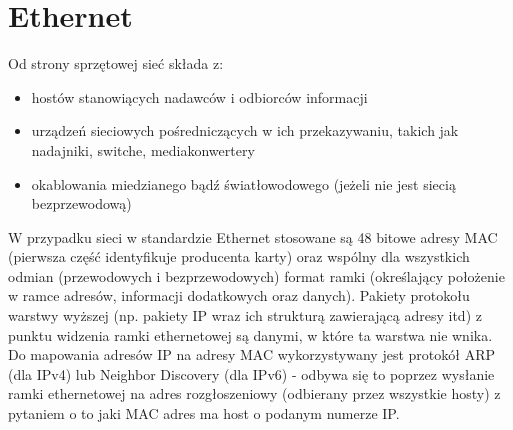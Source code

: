 % 
% 
% 
% 

\section{Ethernet}

Od strony sprzętowej sieć składa z:
\begin{itemize}
	\item hostów stanowiących nadawców i odbiorców informacji
	\item urządzeń sieciowych pośredniczących w ich przekazywaniu, takich jak nadajniki, switche, mediakonwertery
	\item okablowania miedzianego bądź światłowodowego (jeżeli nie jest siecią bezprzewodową)
\end{itemize}

W przypadku sieci w standardzie Ethernet stosowane są 48 bitowe adresy MAC (pierwsza część identyfikuje producenta karty) oraz wspólny dla wszystkich odmian (przewodowych i bezprzewodowych) format ramki (określający położenie w ramce adresów, informacji dodatkowych oraz danych). Pakiety protokołu warstwy wyższej (np. pakiety IP wraz ich strukturą zawierającą adresy itd) z punktu widzenia ramki ethernetowej są danymi, w które ta warstwa nie wnika. Do mapowania adresów IP na adresy MAC wykorzystywany jest protokół ARP (dla IPv4) lub Neighbor Discovery (dla IPv6) - odbywa się to poprzez wysłanie ramki ethernetowej na adres rozgłoszeniowy (odbierany przez wszystkie hosty) z pytaniem o to jaki MAC adres ma host o podanym numerze IP.

